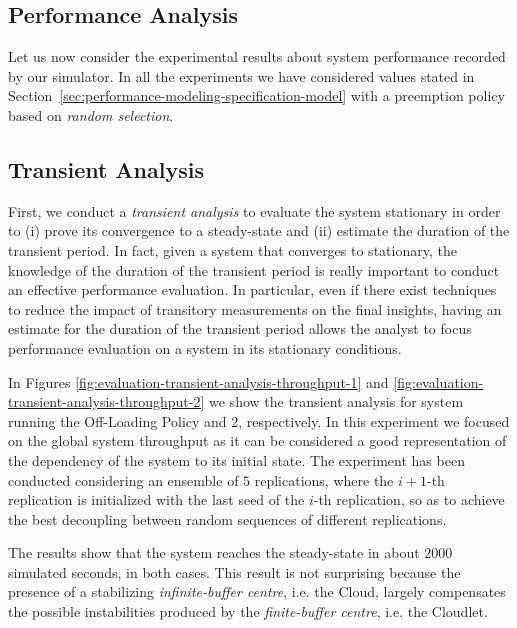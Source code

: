 \subsection{Performance Analysis}
\label{sec:evaluation-performance-analysis}
Let us now consider the experimental results about system performance recorded by our simulator.
In all the experiments we have considered values stated in Section~\ref{sec:performance-modeling-specification-model} with a preemption policy based on \textit{random selection}.

\subsection{Transient Analysis}
\label{sec:evaluation-transient-analysis}
First, we conduct a \textit{transient analysis} to evaluate the system stationary in order to (i) prove its convergence to a steady-state and (ii) estimate the duration of the transient period.
%
In fact, given a system that converges to stationary, the knowledge of the duration of the transient period is really important to conduct an effective performance evaluation. 
%
In particular, even if there exist techniques to reduce the impact of transitory measurements on the final insights, having an estimate for the duration of the transient period allows the analyst to focus performance evaluation on a system in its stationary conditions.

In Figures \ref{fig:evaluation-transient-analysis-throughput-1} and \ref{fig:evaluation-transient-analysis-throughput-2} we show the transient analysis for system running the Off-Loading Policy and 2, respectively. 
In this experiment we focused on the global system throughput as it can be considered a good representation of the dependency of the system to its initial state.
The experiment has been conducted considering an ensemble of $5$ replications, where the $i+1$-th replication is initialized with the last seed of the $i$-th replication, so as to achieve the best decoupling between random sequences of different replications.

The results show that the system reaches the steady-state in about $ 2000$ simulated seconds, in both cases.
This result is not surprising because the presence of a stabilizing \textit{infinite-buffer centre}, i.e. the Cloud, largely compensates the possible instabilities produced by the \textit{finite-buffer centre}, i.e. the Cloudlet.


